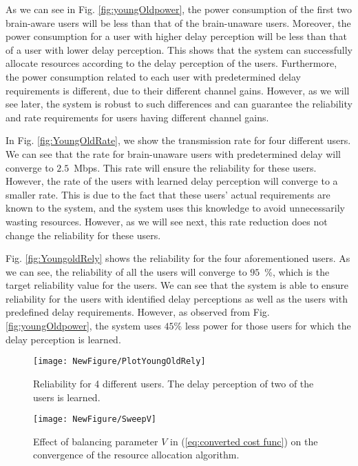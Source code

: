 \documentclass[journal,draftclsnofoot,onecolumn,12pt]{IEEEtran}%
\begin{document}
As we can see in Fig. \ref{fig:youngOldpower}, the power consumption of the first two brain-aware users will be less than that of the brain-unaware users. Moreover, the power consumption for a user with higher delay perception will be less than that of a user with lower delay perception. This shows that the system can successfully allocate resources according to the delay perception of the users. Furthermore, the power consumption related to each user with predetermined delay requirements is different, due to their different channel gains. However, as we will see later, the system is robust to such differences and can guarantee the reliability and rate requirements for users having different channel gains.








In Fig. \ref{fig:YoungOldRate}, we show the transmission rate for four different users. We can see that the rate for brain-unaware users with predetermined delay will converge to  $2.5$~Mbps. This rate will ensure the reliability for these users. However, the rate of the users with learned delay perception will converge to a smaller rate. This is due to the fact that these users' actual requirements are known to the system, and the system uses this knowledge to avoid unnecessarily wasting resources. However, as we will see next, this rate reduction does not change the reliability for these users. 





    
    
    
Fig. \ref{fig:YoungoldRely} shows the reliability for the four aforementioned users. As we can see, the reliability of all the users will converge to $95$~\%, which is the target reliability value for the users. We can see that the system is able to ensure reliability for the users with identified delay perceptions as well as the users with predefined delay requirements. {However, as observed from Fig. \ref{fig:youngOldpower}, the system uses $45$\% less power  for those users for which the delay perception is learned. } 
	\begin{figure}[!t]
    \begin{minipage}{0.5\textwidth}
		\centering
		\texttt{[image: NewFigure/PlotYoungOldRely]}
		\caption{Reliability for {4} different users. The delay perception of two of the users is learned.}
		\label{fig:YoungoldRely}
	\end{minipage}
\begin{minipage}{0.5\textwidth}
		\centering
		\texttt{[image: NewFigure/SweepV]}
		\caption{{Effect of balancing parameter $V$ in (\ref{eq:converted cost func}) on the convergence of the resource allocation algorithm.}}
		\label{fig:V}
        \end{minipage}
	\end{figure}
\end{document}

